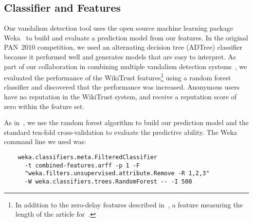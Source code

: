 \newcommand{\sign}{{{\textrm{sign}}}}

\subsection{Classifier and Features}

Our vandalism detection tool uses the open source machine learning
package Weka~\cite{Weka09} to build and evaluate a prediction model from
our features.
In the original PAN~2010 competition, we used an alternating decision
tree (ADTree) classifier~\cite{Adler2010b} because it performed well and
generates models that are easy to interpret.
As part of our collaboration in combining multiple vandalism detection
systems~\cite{Adler2011a}, we evaluated the performance of the
WikiTrust features\footnote{In addition to the zero-delay features
described in~\cite{Adler2010b}, a feature measuring the length
of the article for~\cite{Adler2011a}.}
using a random forest classifier and discovered that the performance was
increased.
Anonymous users have no reputation in the WikiTrust system, and receive
a reputation score of zero within the feature set.

As in~\cite{Adler2011a}, we use the random forest algorithm to build our
prediction model and the standard ten-fold cross-validation to evaluate
the predictive ability.
The Weka command line we used was:
%
{\small
\begin{verbatim}
    weka.classifiers.meta.FilteredClassifier
      -t combined-features.arff -p 1 -F
      "weka.filters.unsupervised.attribute.Remove -R 1,2,3"
      -W weka.classifiers.trees.RandomForest -- -I 500
\end{verbatim}
}

